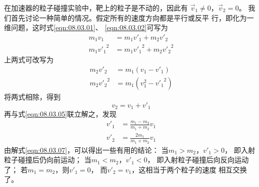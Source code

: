 在加速器的粒子碰撞实验中，靶上的粒子是不动的，因此有
$ \vec { v } _ { 1 } \ne 0 $，$ \vec { v } _ { 2 } = 0 $。
我们首先讨论一种简单的情况。假定所有的速度方向都是平行或反平
行，即化为一维问题，这时式\eqref{eqn:08.03.01}、
\eqref{eqn:08.03.02}可写为
\begin{align}
  m _ { 1 } v _ { 1 }               & = m _ { 1 } v ' _ { 1 } + m _ { 2 } v ' _ { 2 } \label{eqn:08.03.03}                         \\
  m _ { 1 } { v ' _ { 1 } } ^ { 2 } & = m _ { 1 } { v ' _ { 1 } } ^ { 2 } + m _ { 2 } { v ' _ { 2 } } ^ { 2 } \label{eqn:08.03.04}
\end{align}
上两式可改写为
\begin{align}
  m _ { 2 } v ' _ { 2 }             & = m _ { 1 } \left( v _ { 1 } - v ' _ { 1 } \right) \label{eqn:08.03.05}                     \\
  m _ { 2 } { v ' _ { 2 } } ^ { 2 } & = m _ { 1 } \left( v _ { 1 } ^ { 2 } - { v ' _ { 1 } } ^ { 2 } \right) \label{eqn:08.03.06}
\end{align}
将两式相除，得到
\begin{equation*}
  v _ { 2 } = v _ { 1 } + v ' _ { 1 }
\end{equation*}
再与式\eqref{eqn:08.03.05}联立解之，发现
\begin{equation}\label{eqn:08.03.07}
  \begin{split}
    v ' _ { 1 } & = \frac { m _ { 1 } - m _ { 2 } } { m _ { 1 } + m _ { 2 } } v _ { 1 } \\
    v ' _ { 2 } & = \frac { 2 m _ { 1 } } { m _ { 1 } + m _ { 2 } } v _ { 1 }
  \end{split}
\end{equation}
由解式\eqref{eqn:08.03.07}，可以得出一些有用的结论：
当$ m _ { 1 } > m _ { 2 } $，$ v ' _ { 1 } > 0 $，
即入射粒子碰撞后仍向前运动；
当$ m _ { 1 } < m _ { 2 } $，$ v ' _ { 1 } < 0 $，
即入射粒子碰撞后向反向运动了；
若$ m _ { 1 } = m _ { 2 } $，则$ v ' _ { 1 } = 0 $，
而$ v ' _ { 2 } = v _ { 1 } $，这相当于两个粒子的速度
相互交换了。

